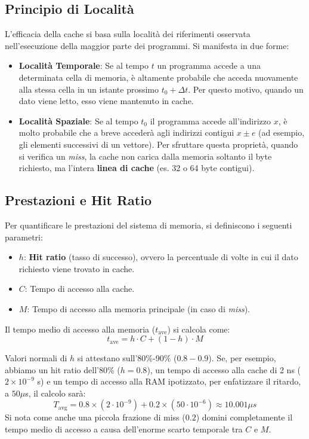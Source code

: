 \subsection{Principio di Località}
L'efficacia della cache si basa sulla località dei riferimenti osservata nell'esecuzione della maggior parte dei programmi. Si manifesta in due forme:
\begin{itemize}
    \item \textbf{Località Temporale}: Se al tempo $t$ un programma accede a una determinata cella di memoria, è altamente probabile che acceda nuovamente alla stessa cella in un istante prossimo $t_0 + \Delta t$. Per questo motivo, quando un dato viene letto, esso viene mantenuto in cache.
    \item \textbf{Località Spaziale}: Se al tempo $t_0$ il programma accede all'indirizzo $x$, è molto probabile che a breve accederà agli indirizzi contigui $x \pm e$ (ad esempio, gli elementi successivi di un vettore). Per sfruttare questa proprietà, quando si verifica un \textit{miss}, la cache non carica dalla memoria soltanto il byte richiesto, ma l'intera \textbf{linea di cache} (es. 32 o 64 byte contigui).
\end{itemize}

\subsection{Prestazioni e Hit Ratio}
Per quantificare le prestazioni del sistema di memoria, si definiscono i seguenti parametri:
\begin{itemize}
    \item $h$: \textbf{Hit ratio} (tasso di successo), ovvero la percentuale di volte in cui il dato richiesto viene trovato in cache.
    \item $C$: Tempo di accesso alla cache.
    \item $M$: Tempo di accesso alla memoria principale (in caso di \textit{miss}).
\end{itemize}

Il tempo medio di accesso alla memoria ($t_{\text{ave}}$) si calcola come:
\[t_{\text{ave}} = h \cdot C + (1 - h) \cdot M\]

Valori normali di $h$ si attestano sull'80\%-90\% ($0.8 - 0.9$).
Se, per esempio, abbiamo un hit ratio dell'80\% ($h=0.8$), un tempo di accesso alla cache di 2 ns ($2 \times 10^{-9}$ s) e un tempo di accesso alla RAM ipotizzato, per enfatizzare il ritardo, a $50 \mu$s, il calcolo sarà:
\[T_{\text{avg}} = 0.8 \times (2 \cdot 10^{-9}) + 0.2 \times (50 \cdot 10^{-6}) \approx 10.001 \mu s\]
Si nota come anche una piccola frazione di miss ($0.2$) domini completamente il tempo medio di accesso a causa dell'enorme scarto temporale tra $C$ e $M$.

